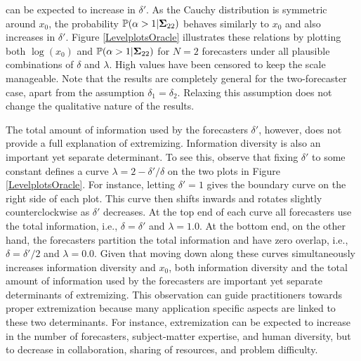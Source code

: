 \documentclass[12pt]{article}
\renewcommand{\P}{\mathbb{P}}
\theoremstyle{definition}
\theoremstyle{definition}
\def\P{{\mathbb P}}
\begin{document}
can be expected to increase in $\delta'$.  As the Cauchy distribution is symmetric around $x_0$, the probability $\P(\alpha > 1 | {\bf\Sigma}_{22})$ behaves similarly to $x_0$ and also increases in $\delta'$.  
Figure \ref{LevelplotsOracle} illustrates these relations by plotting both $\log(x_0)$ and $\P(\alpha > 1 | {\bf\Sigma}_{22})$ for $N = 2$ forecasters under all plausible combinations of $\delta$ and $\lambda$. High values have been censored to keep the scale manageable. Note that the results are completely general for the two-forecaster case, apart from the assumption $\delta_1 = \delta_2$. Relaxing this assumption does not change the qualitative nature of the results.



The total amount of information used by the forecasters $\delta'$, however, does not provide a full
explanation of extremizing.  Information diversity is also an
important yet separate determinant.  To see this, observe that fixing $\delta'$ to
some constant defines a curve $\lambda = 2 - \delta'/\delta$ on the two plots in  Figure \ref{LevelplotsOracle}. For
instance, letting $\delta' = 1$ gives the boundary curve on the right
side of each plot.  This curve then shifts inwards and rotates slightly
counterclockwise as $\delta'$ decreases.  At the top end of each curve
all forecasters use the total information, i.e., $\delta =
\delta'$ and $\lambda = 1.0$.  At the bottom end, on the other hand,
the forecasters partition the total information and have zero overlap, i.e., $\delta =
\delta'/2$ and $\lambda = 0.0$.  Given that
moving down along these curves simultaneously increases information diversity and
$x_0$, both information diversity and the total amount of
information used by the forecasters are important yet separate determinants of  extremizing. This observation can guide practitioners towards proper extremization because  many  application specific aspects are linked to these two determinants. For instance, extremization can be
expected to increase in the number of forecasters,
subject-matter expertise, and human diversity, but to decrease in
collaboration, sharing of resources, and problem difficulty.
 
\end{document}
